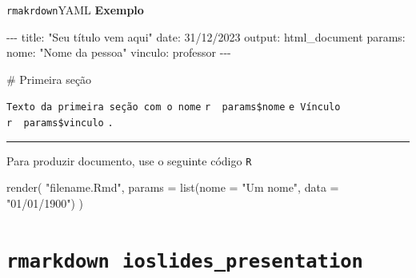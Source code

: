 \documentclass[
  10pt,
  ignorenonframetext,
]{beamer}
\newenvironment{Shaded}{\begin{snugshade}}{\end{snugshade}}
\newcommand{\AttributeTok}[1]{\textcolor[rgb]{0.40,0.45,0.13}{#1}}
\newcommand{\FunctionTok}[1]{\textcolor[rgb]{0.28,0.35,0.67}{#1}}
\newcommand{\NormalTok}[1]{\textcolor[rgb]{0.00,0.23,0.31}{#1}}
\newcommand{\StringTok}[1]{\textcolor[rgb]{0.13,0.47,0.30}{#1}}
\newcommand*{\regrafina}{\rule{\textwidth}{0.5pt}}
\begin{document}
\begin{frame}[fragile]{\texttt{rmakrdown}\newline YAML}
\protect\hypertarget{rmakrdownyaml}{}
\textbf{Exemplo}

\scriptsize

\begin{Shaded}
\begin{Highlighting}[]
\NormalTok{{-}{-}{-}}
\NormalTok{title: "Seu título vem aqui"}
\NormalTok{date: 31/12/2023}
\NormalTok{output: html\_document}
\NormalTok{params:}
\NormalTok{  nome: "Nome da pessoa"}
\NormalTok{  vinculo: professor}
\NormalTok{{-}{-}{-}}

\NormalTok{\# Primeira seção}
\end{Highlighting}
\end{Shaded}

\texttt{Texto\ da\ primeira\ seção\ com\ o\ nome}
\texttt{\textasciigrave{}r\ \ params\$nome\textasciigrave{}}
\texttt{e\ Vínculo}
\texttt{\textasciigrave{}r\ \ params\$vinculo\textasciigrave{}}
\texttt{.}

\regrafina

Para produzir documento, use o seguinte código \texttt{R}

\begin{Shaded}
\begin{Highlighting}[]
\FunctionTok{render}\NormalTok{(}
  \StringTok{"filename.Rmd"}\NormalTok{,}
  \AttributeTok{params =} \FunctionTok{list}\NormalTok{(}\AttributeTok{nome =} \StringTok{"Um nome"}\NormalTok{, }\AttributeTok{data =} \StringTok{"01/01/1900"}\NormalTok{)}
\NormalTok{)}
\end{Highlighting}
\end{Shaded}

\normalsize
\end{frame}

\hypertarget{rmarkdown-ioslides_presentation}{%
\section{\texorpdfstring{\texttt{rmarkdown}\newline\newline~\texttt{ioslides\_presentation}}{rmarkdown~ioslides\_presentation}}\label{rmarkdown-ioslides_presentation}}
\end{document}
